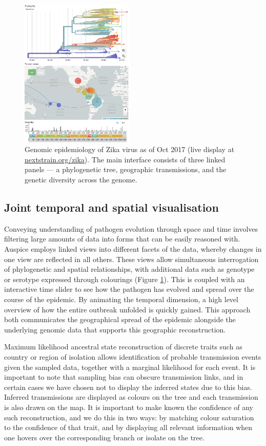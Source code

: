 \documentclass{bioinfo}
\begin{document}
\begin{figure}[!tpb]
\centerline{\includegraphics[width=0.48\textwidth]{figure}}
\caption{Genomic epidemiology of Zika virus as of Oct 2017 (live display at \href{http://nextstrain.org/zika}{nextstrain.org/zika}). The main interface consists of three linked panels --- a phylogenetic tree, geographic transmissions, and the genetic diversity across the genome.}
\label{nextstrain}
\end{figure}


\subsection*{Joint temporal and spatial visualisation}
Conveying understanding of pathogen evolution through space and time involves filtering large amounts of data into forms that can be easily reasoned with.
Auspice employs linked views into different facets of the data, whereby changes in one view are reflected in all others.
These views allow simultaneous interrogation of phylogenetic and spatial relationships, with additional data such as genotype or serotype expressed through colourings (Figure \ref{nextstrain}).
This is coupled with an interactive time slider to see how the pathogen has evolved and spread over the course of the epidemic.
By animating the temporal dimension, a high level overview of how the entire outbreak unfolded is quickly gained.
This approach both communicates the geographical spread of the epidemic alongside the underlying genomic data that supports this geographic reconstruction.

Maximum likelihood ancestral state reconstruction of discrete traits such as country or region of isolation allows identification of probable transmission events given the sampled data, together with a marginal likelihood for each event.
It is important to note that sampling bias can obscure transmission links, and in certain cases we have chosen not to display the inferred states due to this bias.
Inferred transmissions are displayed as colours on the tree and each transmission is also drawn on the map.
It is important to make known the confidence of any such reconstruction, and we do this in two ways: by matching colour saturation to the confidence of that trait, and by displaying all relevant information when one hovers over the corresponding branch or isolate on the tree.
\end{document}
